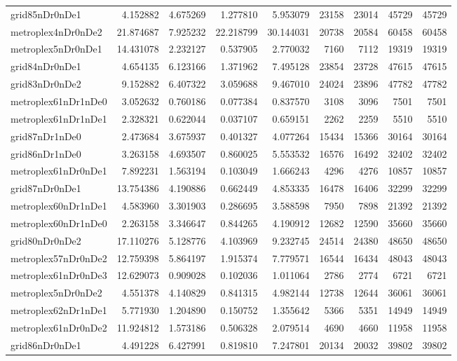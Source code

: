 \begin{longtable}{|l|r|r|r|r|r|r|r|r|}
grid85nDr0nDe1 & 4.152882 & 4.675269 & 1.277810 & 5.953079 & 23158 & 23014 & 45729 & 45729 \\
metroplex4nDr0nDe2 & 21.874687 & 7.925232 & 22.218799 & 30.144031 & 20738 & 20584 & 60458 & 60458 \\
metroplex5nDr0nDe1 & 14.431078 & 2.232127 & 0.537905 & 2.770032 & 7160 & 7112 & 19319 & 19319 \\
grid84nDr0nDe1 & 4.654135 & 6.123166 & 1.371962 & 7.495128 & 23854 & 23728 & 47615 & 47615 \\
grid83nDr0nDe2 & 9.152882 & 6.407322 & 3.059688 & 9.467010 & 24024 & 23896 & 47782 & 47782 \\
metroplex61nDr1nDe0 & 3.052632 & 0.760186 & 0.077384 & 0.837570 & 3108 & 3096 & 7501 & 7501 \\
metroplex61nDr1nDe1 & 2.328321 & 0.622044 & 0.037107 & 0.659151 & 2262 & 2259 & 5510 & 5510 \\
grid87nDr1nDe0 & 2.473684 & 3.675937 & 0.401327 & 4.077264 & 15434 & 15366 & 30164 & 30164 \\
grid86nDr1nDe0 & 3.263158 & 4.693507 & 0.860025 & 5.553532 & 16576 & 16492 & 32402 & 32402 \\
metroplex61nDr0nDe1 & 7.892231 & 1.563194 & 0.103049 & 1.666243 & 4296 & 4276 & 10857 & 10857 \\
grid87nDr0nDe1 & 13.754386 & 4.190886 & 0.662449 & 4.853335 & 16478 & 16406 & 32299 & 32299 \\
metroplex60nDr1nDe1 & 4.583960 & 3.301903 & 0.286695 & 3.588598 & 7950 & 7898 & 21392 & 21392 \\
metroplex60nDr1nDe0 & 2.263158 & 3.346647 & 0.844265 & 4.190912 & 12682 & 12590 & 35660 & 35660 \\
grid80nDr0nDe2 & 17.110276 & 5.128776 & 4.103969 & 9.232745 & 24514 & 24380 & 48650 & 48650 \\
metroplex57nDr0nDe2 & 12.759398 & 5.864197 & 1.915374 & 7.779571 & 16544 & 16434 & 48043 & 48043 \\
metroplex61nDr0nDe3 & 12.629073 & 0.909028 & 0.102036 & 1.011064 & 2786 & 2774 & 6721 & 6721 \\
metroplex5nDr0nDe2 & 4.551378 & 4.140829 & 0.841315 & 4.982144 & 12738 & 12644 & 36061 & 36061 \\
metroplex62nDr1nDe1 & 5.771930 & 1.204890 & 0.150752 & 1.355642 & 5366 & 5351 & 14949 & 14949 \\
metroplex61nDr0nDe2 & 11.924812 & 1.573186 & 0.506328 & 2.079514 & 4690 & 4660 & 11958 & 11958 \\
grid86nDr0nDe1 & 4.491228 & 6.427991 & 0.819810 & 7.247801 & 20134 & 20032 & 39802 & 39802 \\

\end{longtable}
